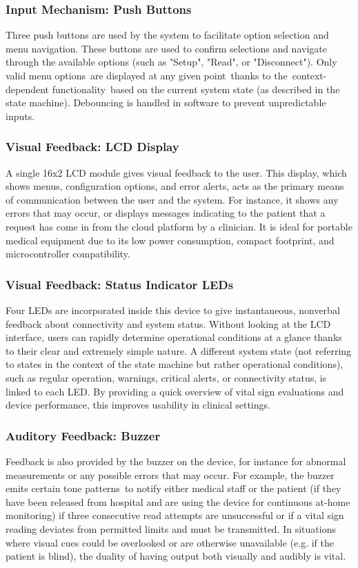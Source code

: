 \subsubsection{Input Mechanism: Push Buttons}
Three push buttons are used by the system to facilitate option selection and menu navigation. These buttons are used to confirm selections and navigate through the available options (such as "Setup", "Read", or "Disconnect"). Only valid menu options are displayed at any given point thanks to the context-dependent functionality based on the current system state (as described in the state machine). Debouncing is handled in software to prevent unpredictable inputs.

\subsubsection{Visual Feedback: LCD Display}
A single 16x2 LCD module gives visual feedback to the user. This display, which shows menus, configuration options, and error alerts, acts as the primary means of communication between the user and the system. For instance, it shows any errors that may occur, or displays messages indicating to the patient that a request has come in from the cloud platform by a clinician. It is ideal for portable medical equipment due to its low power consumption, compact footprint, and microcontroller compatibility.

\subsubsection{Visual Feedback: Status Indicator LEDs}
Four LEDs are incorporated inside this device to give instantaneous, nonverbal feedback about connectivity and system status. Without looking at the LCD interface, users can rapidly determine operational conditions at a glance thanks to their clear and extremely simple nature. A different system state (not referring to states in the context of the state machine but rather operational conditions), such as regular operation, warnings, critical alerts, or connectivity status, is linked to each LED. By providing a quick overview of vital sign evaluations and device performance, this improves usability in clinical settings.

\subsubsection{Auditory Feedback: Buzzer}
Feedback is also provided by the buzzer on the device, for instance for abnormal measurements or any possible errors that may occur. For example, the buzzer emits certain tone patterns to notify either medical staff or the patient (if they have been released from hospital and are using the device for continuous at-home monitoring) if three consecutive read attempts are unsuccessful or if a vital sign reading deviates from permitted limits and must be transmitted. In situations where visual cues could be overlooked or are otherwise unavailable (e.g. if the patient is blind), the duality of having output both visually and audibly is vital.

